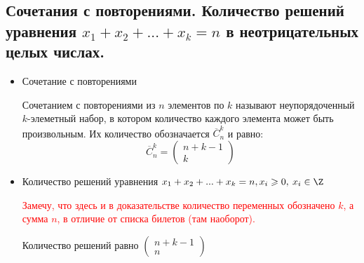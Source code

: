 \subsection{Сочетания с повторениями. Количество решений уравнения $x_1 + x_2 + . . . + x_k = n$ в неотрицательных целых числах.}
\begin{itemize}
	\item Сочетание с повторениями
	
	Сочетанием с повторениями из $n$ элементов по $k$ называют неупорядоченный $k$-элеметный набор, в котором количество каждого элемента может быть произвольным. Их количество обозначается $\overline C^k_n$ и равно:
	$$\overline C^k_n = \begin{pmatrix}n+k-1\\k\end{pmatrix}$$
	
	\item Количество решений уравнения $x_1 + x_2 + ... + x_k = n, x_i \geqslant 0, \: x_i \in \Z$
	
	\textcolor{red}{Замечу, что здесь и в доказательстве количество переменных обозначено $k$, а сумма $n$, в отличие от списка билетов (там наоборот).} 
	
	Количество решений равно $\displaystyle \begin{pmatrix}n+k-1\\n\end{pmatrix}$
\end{itemize}